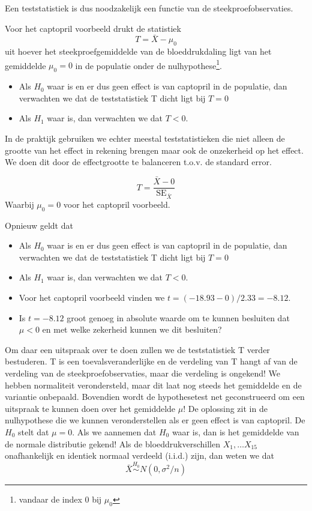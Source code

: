 \documentclass[12pt,dutch,coursenotes]{book}
\providecommand{\tightlist}{%
  \setlength{\itemsep}{0pt}\setlength{\parskip}{0pt}}
\let\rmarkdownfootnote\footnote%
\def\footnote{\protect\rmarkdownfootnote}
\theoremstyle{definition}
\theoremstyle{definition}
\theoremstyle{definition}
\theoremstyle{remark}
\begin{document}
Een teststatistiek is dus noodzakelijk een functie van de
steekproefobservaties.

Voor het captopril voorbeeld drukt de statistiek \[T=\bar X - \mu_0\]
uit hoever het steekproefgemiddelde van de bloeddrukdaling ligt van het
gemiddelde \(\mu_0=0\) in de populatie onder de nulhypothese\footnote{vandaar
  de index 0 bij \(\mu_0\)}.

\begin{itemize}
\tightlist
\item
  Als \(H_0\) waar is en er dus geen effect is van captopril in de
  populatie, dan verwachten we dat de teststatistiek T dicht ligt bij
  \(T=0\)
\item
  Als \(H_1\) waar is, dan verwachten we dat \(T<0\).
\end{itemize}

In de praktijk gebruiken we echter meestal teststatistieken die niet
alleen de grootte van het effect in rekening brengen maar ook de
onzekerheid op het effect. We doen dit door de effectgrootte te
balanceren t.o.v. de standard error.

\[T=\frac{\bar{X}-0}{\text{SE}_{\bar X}}\] Waarbij \(\mu_0=0\) voor het
captopril voorbeeld.

Opnieuw geldt dat

\begin{itemize}
\tightlist
\item
  Als \(H_0\) waar is en er dus geen effect is van captopril in de
  populatie, dan verwachten we dat de teststatistiek T dicht ligt bij
  \(T=0\)
\item
  Als \(H_1\) waar is, dan verwachten we dat \(T<0\).
\item
  Voor het captopril voorbeeld vinden we \(t=(-18.93-0)/2.33=-8.12\).
\item
  Is \(t = -8.12\) groot genoeg in absolute waarde om te kunnen
  besluiten dat \(\mu < 0\) en met welke zekerheid kunnen we dit
  besluiten?
\end{itemize}

Om daar een uitspraak over te doen zullen we de teststatistiek T verder
bestuderen. T is een toevalsveranderlijke en de verdeling van T hangt af
van de verdeling van de steekproefobservaties, maar die verdeling is
ongekend! We hebben normaliteit verondersteld, maar dit laat nog steeds
het gemiddelde en de variantie onbepaald. Bovendien wordt de
hypothesetest net geconstrueerd om een uitspraak te kunnen doen over het
gemiddelde \(\mu\)! De oplossing zit in de nulhypothese die we kunnen
veronderstellen als er geen effect is van captopril. De \(H_0\) stelt
dat \(\mu=0\). Als we aannemen dat \(H_0\) waar is, dan is het
gemiddelde van de normale distributie gekend! Als de
bloeddrukverschillen \(X_1, \ldots X_{15}\) onafhankelijk en identiek
normaal verdeeld (i.i.d.) zijn, dan weten we dat
\[\bar X  \stackrel{H_0}{\sim} N(0, \sigma^2/n)\]
\end{document}
